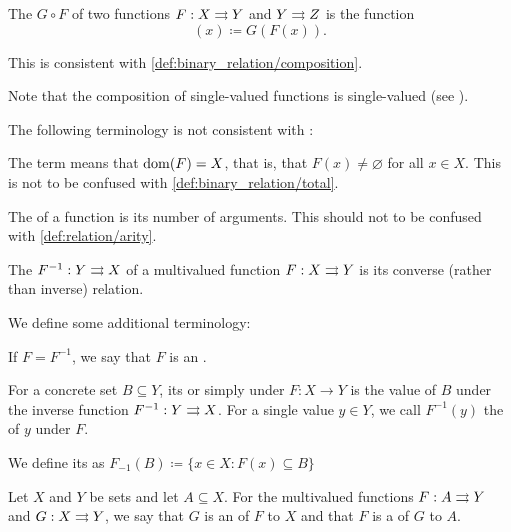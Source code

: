 \begin{definition}
\begin{defenum}[resume=def:function]
     The  \( G \circ F \) of two functions \( F: X \rightrightarrows Y \) and \( Y \rightrightarrows Z \) is the function
    \begin{equation*}
      [G \circ F](x) \coloneqq G(F(x)).
    \end{equation*}

    This is consistent with \cref{def:binary_relation/composition}.

    Note that the composition of single-valued functions is single-valued (see ).
  \end{defenum}

  The following terminology is not consistent with :
  \begin{defenum}[resume=def:function]
     The term  means that \( \operatorname{dom}(F) = X \), that is, that \( F(x) \neq \varnothing \) for all \( x \in X \). This is not to be confused with \cref{def:binary_relation/total}.

     The  of a function is its number of arguments. This should not to be confused with \cref{def:relation/arity}.

     The  \( F^{-1}: Y \rightrightarrows X \) of a multivalued function \( F: X \rightrightarrows Y \) is its converse (rather than inverse) relation.
  \end{defenum}

  We define some additional terminology:
  \begin{defenum}[resume=def:function]
     If \( F = F^{-1} \), we say that \( F \) is an .

     For a concrete set \( B \subseteq Y \), its  or simply  under \( F: X \to Y \) is the value of \( B \) under the inverse function \( F^{-1}: Y \rightrightarrows X \). For a single value \( y \in Y \), we call \( F^{-1}(y) \) the  of \( y \) under \( F \).

    We define its  as \( F_{-1}(B) \coloneqq \{ x \in X \colon F(x) \subseteq B \} \)

     Let \( X \) and \( Y \) be sets and let \( A \subseteq X \). For the multivalued functions \( F: A \rightrightarrows Y \) and \( G: X \rightrightarrows Y \), we say that \( G \) is an  of \( F \) to \( X \) and that \( F \) is a  of \( G \) to \( A \).


\end{defenum}
\end{definition}
